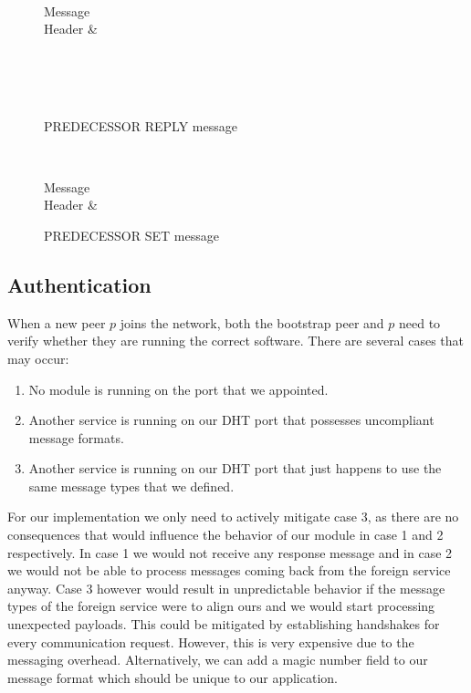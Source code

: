 \documentclass[a4paper, 11pt]{article}
\begin{document}
\begin{figure}[h!]
	\centering
	\begin{bytefield}[bitwidth=0.8em]{32}
		 \\
		\begin{rightwordgroup}{Message \\  Header}
			 & 
		\end{rightwordgroup} \\
		 \\
		\skippedwords \\
	\end{bytefield}
	\caption{PREDECESSOR REPLY message}
	\label{PREDECESSORREPLY}
\end{figure}

\begin{figure}[h!]
	\centering
	\begin{bytefield}[bitwidth=0.8em]{32}
		 \\
		\begin{rightwordgroup}{Message \\  Header}
			 & 
		\end{rightwordgroup}
	\end{bytefield}
	\caption{PREDECESSOR SET message}
	\label{PREDECESSORSET}
\end{figure}

\subsection*{Authentication}

When a new peer $p$ joins the network, both the bootstrap peer and $p$ need to verify whether they are running the correct software. There are several cases that may occur:

\begin{enumerate}
	\item No module is running on the port that we appointed.
	\item Another service is running on our DHT port that possesses uncompliant message formats. 
	\item Another service is running on our DHT port that just happens to use the same message types that we defined.
\end{enumerate}

For our implementation we only need to actively mitigate case 3, as there are no consequences that would influence the behavior of our module in case 1 and 2 respectively. In case 1 we would not receive any response message and in case 2 we would not be able to process messages coming back from the foreign service anyway. Case 3 however would result in unpredictable behavior if the message types of the foreign service were to align ours and we would start processing unexpected payloads. This could be mitigated by establishing handshakes for every communication request. However, this is very expensive due to the messaging overhead. Alternatively, we can add a magic number field to our message format which should be unique to our application.
\end{document}

